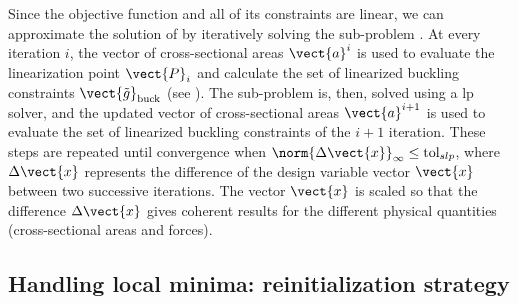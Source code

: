 Since the objective function and all of its constraints are linear, we can approximate the solution of  by iteratively solving the sub-problem . At every iteration $i$, the vector of cross-sectional areas $\vect{a}^i$ is used to evaluate the linearization point $\vect{P}_{i}$ and calculate the set of linearized buckling constraints $\vect{\tilde{g}}_{\textrm{buck}}$ (see ). The sub-problem  is, then, solved using a \gls{lp} solver, and the updated vector of cross-sectional areas $\vect{a}^{i+1}$ is used to evaluate the set of linearized buckling constraints of the $i+1$ iteration. These steps are repeated until convergence \ie when $\norm{\Delta \vect{x}}_\infty\leq \text{tol}_{slp}$, where $\Delta \vect{x}$ represents the difference of the design variable vector $\vect{x}$ between two successive iterations. The vector $\vect{x}$ is scaled so that the difference $\Delta \vect{x}$ gives coherent results for the different physical quantities (cross-sectional areas and forces).

\subsection{Handling local minima: reinitialization strategy}
\label{sec:04_reinit}

